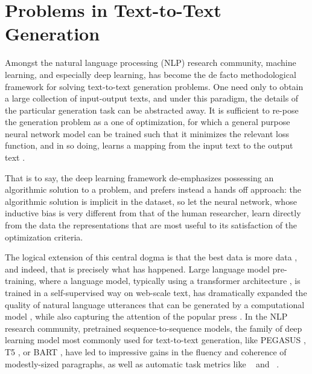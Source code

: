 \section{Problems in Text-to-Text Generation}
  
Amongst the natural language processing (NLP) research community, machine
learning, and especially deep learning, has become the de facto
methodological framework  for solving text-to-text
generation problems.  One need only to obtain a large collection of
input-output texts, and under this paradigm, the details of the particular
generation task can be abstracted away. It is sufficient to re-pose the
generation problem as a one of optimization, for which a general purpose
neural network model can be trained such that it minimizes the relevant loss
function, and in so doing, learns a mapping from the input text to the output
text \citep{sutskever2014,bahdanau2015,rush2015,nallapati2016,see2017}. 

That is to say, the deep learning framework de-emphasizes possessing
an algorithmic solution to a problem,
and prefers instead a hands off
approach: the algorithmic solution is implicit in the dataset, so let the
neural network, whose inductive bias is very different from that of the human
researcher, learn directly from the data the representations that are most
useful to its satisfaction of the optimization criteria.%

The logical extension of this
central dogma is that the best data is more data \citep{halevy2009},
and indeed, that is precisely what has happened. Large language model
pre-training, where a language model, typically using a transformer
architecture \citep{vaswani2017}, is trained in a self-supervised way on
web-scale text, has dramatically expanded the quality of natural language
utterances that can be generated by a computational model
\citep{radford2019,brown2020}, while also capturing the attention of the
popular press \citep{simonite2019,vincent2019}. In the NLP research community,
pretrained sequence-to-sequence models, the family of deep learning model most
commonly used for text-to-text generation, like PEGASUS \citep{zhang2019}, T5
\citep{raffel2020}, or BART \citep{lewis2020}, have led to impressive gains in
the fluency and coherence of modestly-sized paragraphs, as well as automatic
task metrics like \bleu~\citep{papineni2002} and \rouge~\citep{lin2004}.

